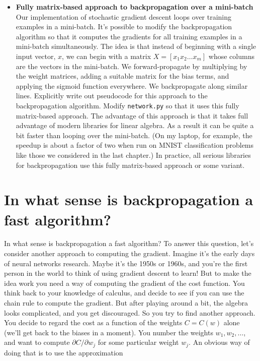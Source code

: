 \begin{itemize}
\item \textbf{Fully matrix-based approach to backpropagation over a mini-batch}\\
Our implementation of stochastic gradient descent loops over training examples in a mini-batch. It's possible to modify the backpropagation algorithm so that it computes the gradients for all training examples in a mini-batch simultaneously. The idea is that instead of beginning with a single input vector, $x$, we can begin with a matrix $X=[x_1 x_2 … x_m]$ whose columns are the vectors in the mini-batch. We forward-propagate by multiplying by the weight matrices, adding a suitable matrix for the bias terms, and applying the sigmoid function everywhere. We backpropagate along similar lines. Explicitly write out pseudocode for this approach to the backpropagation algorithm. Modify \texttt{network.py} so that it uses this fully matrix-based approach. The advantage of this approach is that it takes full advantage of modern libraries for linear algebra. As a result it can be quite a bit faster than looping over the mini-batch. (On my laptop, for example, the speedup is about a factor of two when run on MNIST classification problems like those we considered in the last chapter.) In practice, all serious libraries for backpropagation use this fully matrix-based approach or some variant.
\end{itemize}

\section{In what sense is backpropagation a fast algorithm?}
\label{sec: In what sense is backpropagation a fast algorithm?}

In what sense is backpropagation a fast algorithm? To answer this question, let's consider another approach to computing the gradient. Imagine it's the early days of neural networks research. Maybe it's the 1950s or 1960s, and you're the first person in the world to think of using gradient descent to learn! But to make the idea work you need a way of computing the gradient of the cost function. You think back to your knowledge of calculus, and decide to see if you can use the chain rule to compute the gradient. But after playing around a bit, the algebra looks complicated, and you get discouraged. So you try to find another approach. You decide to regard the cost as a function of the weights $C=C(w)$ alone (we'll get back to the biases in a moment). You number the weights $w_1,w_2,\ldots$, and want to compute $\partial C/\partial w_j$ for some particular weight $w_j$. An obvious way of doing that is to use the approximation

